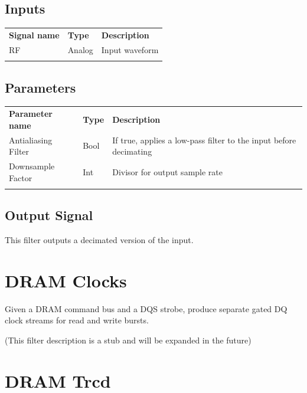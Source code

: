 \subsection{Inputs}

\begin{tabularx}{16cm}{llX}
\thickhline
\textbf{Signal name} & \textbf{Type} & \textbf{Description} \\
\thickhline
RF & Analog & Input waveform\\
\thickhline
\end{tabularx}

\subsection{Parameters}

\begin{tabularx}{16cm}{llX}
\thickhline
\textbf{Parameter name} & \textbf{Type} & \textbf{Description} \\
\thickhline
Antialiasing Filter & Bool & If true, applies a low-pass filter to the input before decimating\\
\thinhline
Downsample Factor & Int & Divisor for output sample rate\\
\thickhline
\end{tabularx}

\subsection{Output Signal}

This filter outputs a decimated version of the input.

\pagebreak
\section{DRAM Clocks}
\label{filter:dramclocks}

Given a DRAM command bus and a DQS strobe, produce separate gated DQ clock streams for read and write bursts.

(This filter description is a stub and will be expanded in the future)

\pagebreak
\section{DRAM Trcd}
\label{filter:dramtrcd}

